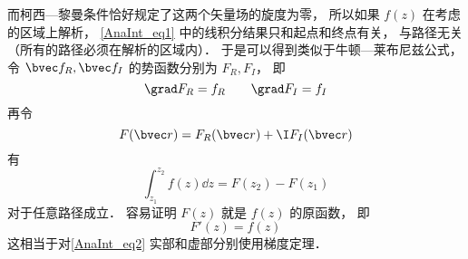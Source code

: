 
\begin{issues}
\issueDraft
\end{issues}



而柯西—黎曼条件恰好规定了这两个矢量场的旋度为零， 所以如果 $f(z)$ 在考虑的区域上解析， \autoref{AnaInt_eq1} 中的线积分结果只和起点和终点有关， 与路径无关（所有的路径必须在解析的区域内）． 于是可以得到类似于牛顿—莱布尼兹公式， 令 $\bvec f_R, \bvec f_I$ 的势函数分别为 $F_R, F_I$， 即
\begin{equation}
\grad F_R = f_R
\qquad
\grad F_I = f_I
\end{equation}
再令
\begin{equation}
F(\bvec r) = F_R(\bvec r) + \I F_I(\bvec r)
\end{equation}
有
\begin{equation}\label{AnaInt_eq2}
\int_{z_1}^{z_2} f(z) \dd{z} = F(z_2) - F(z_1)
\end{equation}
对于任意路径成立． 容易证明 $F(z)$ 就是 $f(z)$ 的原函数， 即
\begin{equation}
F'(z) = f(z)
\end{equation}
这相当于对\autoref{AnaInt_eq2} 实部和虚部分别使用梯度定理．

